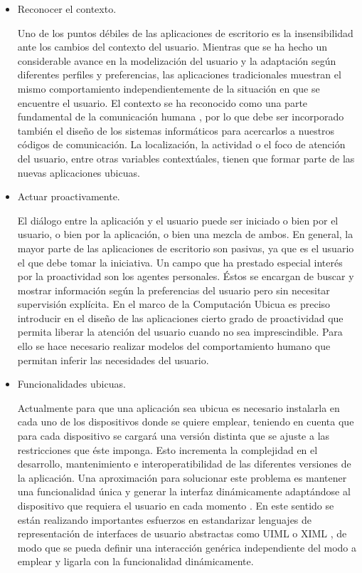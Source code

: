 \begin{itemize}
 
\item Reconocer el contexto. 

Uno de los puntos débiles de las aplicaciones de escritorio es la insensibilidad
ante los cambios del contexto del usuario.
Mientras que se ha hecho un considerable avance en la modelización del usuario
y la adaptación según diferentes perfiles y preferencias, las aplicaciones
tradicionales muestran el mismo comportamiento independientemente de la
situación en que se encuentre el usuario. El contexto se ha reconocido como
una parte fundamental de la comunicación humana \cite{cap1.69}, por lo que
debe ser incorporado también el diseño de los sistemas informáticos para
acercarlos a nuestros códigos de comunicación. La localización, la actividad o
el foco de atención del usuario, entre otras variables contextúales, tienen que
formar parte de las nuevas aplicaciones ubicuas.

\item Actuar proactivamente. 

El diálogo entre la aplicación y el usuario puede
ser iniciado o bien por el usuario, o bien por la aplicación, o bien una
mezcla de ambos. En general, la mayor parte de las aplicaciones de escritorio
son pasivas, ya que es el usuario el que debe tomar la iniciativa. Un
campo que ha prestado especial interés por la proactividad son los agentes
personales. Éstos se encargan de buscar y mostrar información según la
preferencias del usuario pero sin necesitar supervisión explícita. En el marco
de la Computación Ubicua es preciso introducir en el diseño de las aplicaciones
cierto grado de proactividad que permita liberar la atención del usuario
cuando no sea imprescindible. Para ello se hace necesario realizar modelos
del comportamiento humano \cite{cap1.198} que permitan inferir las
necesidades del usuario.

\item Funcionalidades ubicuas. 

Actualmente para que una aplicación sea ubicua
es necesario instalarla en cada uno de los dispositivos donde se quiere emplear,
teniendo en cuenta que para cada dispositivo se cargará una versión distinta que
se ajuste a las restricciones que éste imponga. Esto incrementa la complejidad
en el desarrollo, mantenimiento e interoperatibilidad de las diferentes
versiones de la aplicación. Una aproximación para solucionar este problema es
mantener una funcionalidad única y generar la interfaz dinámicamente adaptándose
al dispositivo que requiera el usuario en cada momento \cite{cap1.205}. En este
sentido se están realizando importantes esfuerzos en estandarizar lenguajes de
representación de interfaces de usuario abstractas como UIML \cite{cap1.16} o
XIML \cite{cap1.214}, de modo que se pueda definir una interacción genérica
independiente del modo a emplear y ligarla con la funcionalidad dinámicamente.
\end{itemize}

